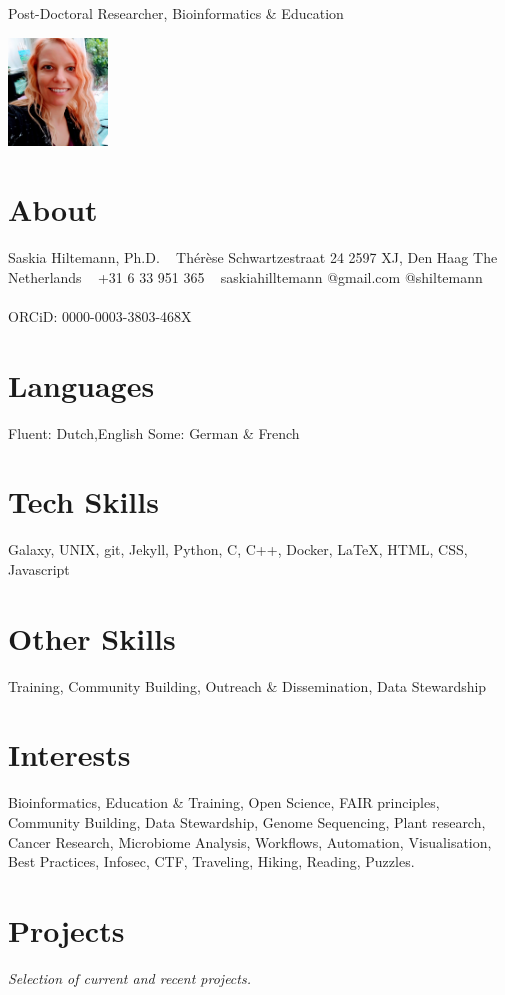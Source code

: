 \documentclass[]{shiltemann-cv}
\begin{document}
    {Post-Doctoral Researcher, Bioinformatics \& Education}


\begin{aside}
  \includegraphics[width=75pt]{photo-saskia.png}
  \section{About}
    Saskia Hiltemann, Ph.D.
    ~
    Thérèse Schwartzestraat 24
    2597 XJ, Den Haag
    The Netherlands
    ~
    +31 6 33 951 365 \faPhone
    ~
    saskiahilltemann @gmail.com \faEnvelope
    @shiltemann \faGithub \ \faTwitter \ \faLinkedin
    \ \\
    ORCiD:
    0000-0003-3803-468X \faOrcid
  \section{Languages}
    Fluent: Dutch,English
    Some: German \& French
  \section{Tech Skills}
    Galaxy, UNIX, git, Jekyll, Python, C, C++, Docker, LaTeX, HTML, CSS, Javascript
  \section{Other Skills}
    Training, Community Building, Outreach \& Dissemination, Data Stewardship
\end{aside}

\section{Interests}

Bioinformatics, Education \& Training, Open Science, FAIR principles, Community Building, Data Stewardship, Genome Sequencing, Plant research, Cancer Research, Microbiome Analysis, Workflows, Automation, Visualisation, Best Practices, Infosec, CTF, Traveling, Hiking, Reading, Puzzles.


\section{Projects}
\emph{Selection of current and recent projects.}
\end{document}
